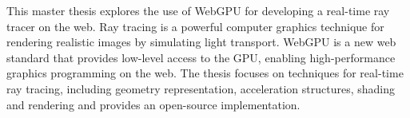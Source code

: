 
This master thesis explores the use of WebGPU for developing a real-time ray tracer on the web. Ray tracing is a powerful computer graphics technique for rendering realistic images by simulating light transport. WebGPU is a new web standard that provides low-level access to the GPU, enabling high-performance graphics programming on the web.
The thesis focuses on techniques for real-time ray tracing, including geometry representation, acceleration structures, shading and rendering and provides an open-source implementation.
